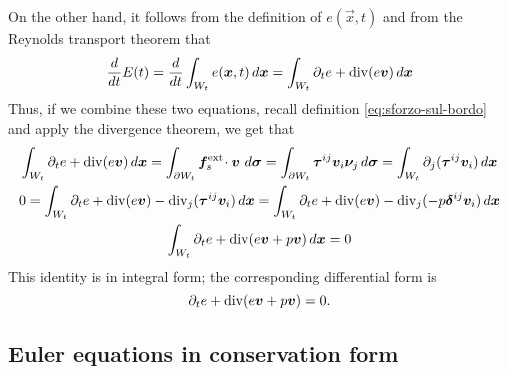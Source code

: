 On the other hand, it follows from the definition of $e(\vec{x},t)$ and
from the Reynolds transport theorem that
\[
\frac{d}{dt} E(t)
	= \frac{d}{dt} \int_{W_t} e(\bm{x},t) \, d\bm{x}
	= \int_{W_t} \partial_t e + \operatorname{div}(e \bm{v}) \, d\bm{x}
\]
Thus, if we combine these two equations, recall definition 
\eqref{eq:sforzo-sul-bordo} and apply the divergence theorem, we get that
\begin{gather*}
\int_{W_t} \partial_t e + \operatorname{div}(e \bm{v}) \, d\bm{x}
	= \int_{\partial W_t} \bm{f}_s^{\text{ext}} \!\cdot \bm{v} \, \, d\bm{\sigma}
	= \int_{\partial W_t} \bm{\tau}^{ij} \bm{v}_i \bm{\nu}_j \, d\bm{\sigma}
	= \int_{W_t} \partial_j (\bm{\tau}^{ij} \bm{v}_i) \, d\bm{x} \\
0
	= \int_{W_t} \partial_t e + \operatorname{div}(e \bm{v})
	- \operatorname{div}_j(\bm{\tau}^{ij} \bm{v}_i) \, d\bm{x}
	= \int_{W_t} \partial_t e + \operatorname{div}(e \bm{v})
	- \operatorname{div}_j(-p \bm{\delta}^{ij} \bm{v}_i) \, d\bm{x} \\
\int_{W_t} \partial_t e + \operatorname{div}(e \bm{v} + p \bm{v}) \, d\bm{x} = 0
\end{gather*}
This identity is in integral form; the corresponding differential form is
\begin{equation} \label{eq:bilancio-energia}
\partial_t e + \operatorname{div}(e \bm{v} + p \bm{v}) = 0.
\end{equation}

\subsection*{Euler equations in conservation form}

